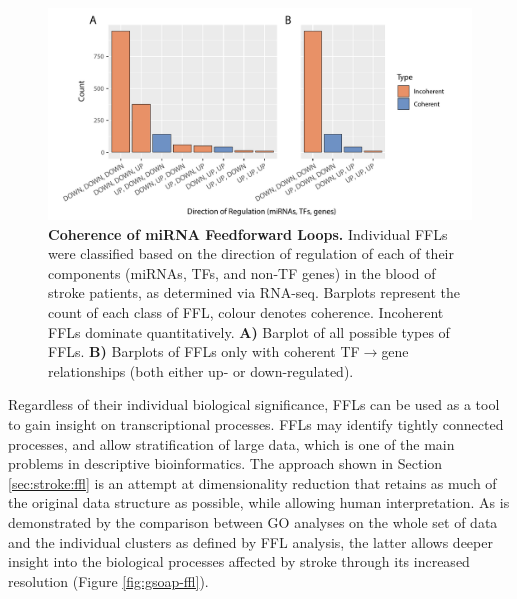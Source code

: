 \begin{figure}
\centering
\includegraphics[width=\textwidth]{figures/ffl-coherence}
\caption[Coherence of miRNA Feedforward Loops.]{\textbf{Coherence of miRNA Feedforward Loops.} Individual FFLs were classified based on the direction of regulation of each of their components (miRNAs, TFs, and non-TF genes) in the blood of stroke patients, as determined via RNA-seq. Barplots represent the count of each class of FFL, colour denotes coherence. Incoherent FFLs dominate quantitatively. \textbf{A)} Barplot of all possible types of FFLs. \textbf{B)} Barplots of FFLs only with coherent TF$\to$gene relationships (both either up- or down-regulated). 
\label{fig:ffl-coherence}}
\end{figure}

Regardless of their individual biological significance, FFLs can be used as a tool to gain insight on transcriptional processes. FFLs may identify tightly connected processes, and allow stratification of large data, which is one of the main problems in descriptive bioinformatics. The approach shown in Section \ref{sec:stroke:ffl} is an attempt at dimensionality reduction that retains as much of the original data structure as possible, while allowing human interpretation. As is demonstrated by the comparison between GO analyses on the whole set of data and the individual clusters as defined by FFL analysis, the latter allows deeper insight into the biological processes affected by stroke through its increased resolution (Figure \ref{fig:gsoap-ffl}).

